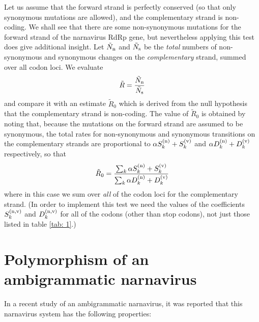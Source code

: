 \documentclass[9pt,lineno]{elife}
\begin{document}
Let us assume that the forward strand is perfectly conserved (so that only synonymous 
mutations are allowed), and the complementary strand is non-coding. We shall see that there are some 
non-synonymous mutations for the forward strand of the narnavirus RdRp gene, but nevertheless applying this 
test does give additional insight. Let $\tilde N_{\rm n}$ and $\tilde N_{\rm s}$ 
be the \emph{total} numbers of non-synonymous and synonymous changes on the \emph{complementary} strand, 
summed over all codon loci. We evaluate 
%
\begin{equation}
\label{eq: 3.8}
\tilde R=\frac{\tilde N_{\rm n}}{\tilde N_{\rm s}}
\end{equation}
%
and compare it with an estimate $\tilde R_0$ which is derived from the null hypothesis that the complementary 
strand is non-coding. The value of $\tilde R_0$ is obtained by noting that, because the mutations on the forward 
strand are assumed to be synonymous, the total rates for non-synonymous and synonymous transitions 
on the complementary strands are proportional to $\alpha S^{({\rm n})}_k +S^{({\rm v})}_k$ and 
$\alpha D^{({\rm n})}_k +D^{({\rm v})}_k$ respectively, so that
%
\begin{equation}
\label{eq: 3.9}
\tilde R_0=\frac{\sum_k\alpha S_k^{({\rm n})}+S^{({\rm v})}_k}
{\sum_k \alpha D^{({\rm n})}_k+D_k^{({\rm v})}}
\end{equation}
%
where in this case we sum over \emph{all} of the codon loci for the complementary strand. 
(In order to implement this test we need the values of the coefficients $S^{({\rm n,v})}_k$ and 
$D^{({\rm n,v})}_k$ for all of the codons (other than stop codons), not just those listed in table \ref{tab: 1}.)

\section{Polymorphism of an ambigrammatic narnavirus}
\label{sec: 4}

In a recent study  \cite{Bat+20} of an ambigrammatic narnavirus, it was reported that this 
narnavirus system has the following properties:
\end{document}
